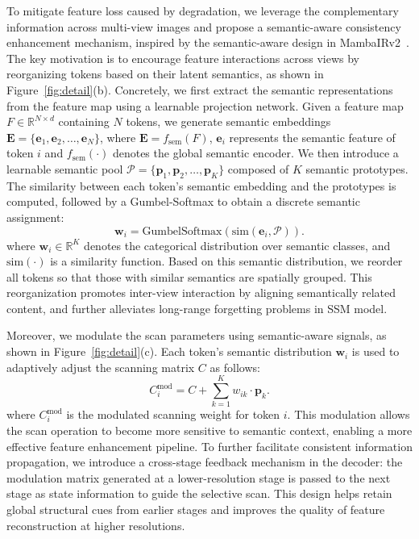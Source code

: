 \documentclass[letterpaper]{article} %
\begin{document}
To mitigate feature loss caused by degradation, we leverage the complementary information across multi-view images and propose a semantic-aware consistency enhancement mechanism, inspired by the semantic-aware design in MambaIRv2~\cite{guo2025mambairv2}. The key motivation is to encourage feature interactions across views by reorganizing tokens based on their latent semantics, as shown in Figure~\ref{fig:detail}(b). Concretely, we first extract the semantic representations from the feature map using a learnable projection network. Given a feature map $F \in \mathbb{R}^{N \times d}$ containing $N$ tokens, we generate semantic embeddings $\mathbf{E} = \{\mathbf{e}_1, \mathbf{e}_2, \dots, \mathbf{e}_N\}$, where $\mathbf{E} = f_{\text{sem}}(F)$, $\mathbf{e}_i$ represents the semantic feature of token $i$ and $f_{\text{sem}}(\cdot)$ denotes the global semantic encoder. We then introduce a learnable semantic pool $\mathcal{P} = \{\mathbf{p}_1, \mathbf{p}_2, \dots, \mathbf{p}_K\}$ composed of $K$ semantic prototypes. The similarity between each token’s semantic embedding and the prototypes is computed, followed by a Gumbel-Softmax to obtain a discrete semantic assignment:
\begin{equation}
    \mathbf{w}_i = \mathrm{GumbelSoftmax}(\mathrm{sim}(\mathbf{e}_i, \mathcal{P})).
\end{equation}
where $\mathbf{w}_i \in \mathbb{R}^K$ denotes the categorical distribution over semantic classes, and $\mathrm{sim}(\cdot)$ is a similarity function. Based on this semantic distribution, we reorder all tokens so that those with similar semantics are spatially grouped. This reorganization promotes inter-view interaction by aligning semantically related content, and further alleviates long-range forgetting problems in SSM model.


Moreover, we modulate the scan parameters using semantic-aware signals, as shown in Figure~\ref{fig:detail}(c). Each token’s semantic distribution $\mathbf{w}_i$ is used to adaptively adjust the scanning matrix $C$ as follows:
\begin{equation}
    C_i^{\text{mod}} = C + \sum_{k=1}^K w_{ik} \cdot \mathbf{p}_k.
\end{equation}
where $C_i^{\text{mod}}$ is the modulated scanning weight for token $i$. This modulation allows the scan operation to become more sensitive to semantic context, enabling a more effective feature enhancement pipeline. To further facilitate consistent information propagation, we introduce a cross-stage feedback mechanism in the decoder: the modulation matrix generated at a lower-resolution stage is passed to the next stage as state information to guide the selective scan. This design helps retain global structural cues from earlier stages and improves the quality of feature reconstruction at higher resolutions.
\end{document}
